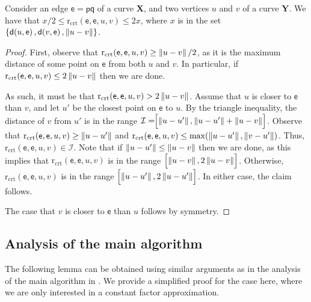 \documentclass[12pt]{article}
\newcommand{\seclab}[1]{\label{sec:#1}}
\newcommand{\lemlab}[1]{\label{lemma:#1}}
\newcommand{\pbrc}[2][\!\!]{#1\left[ {#2} \MakeBig \right]}
\newcommand{\distX}[2]{\distCmd{#1 - #2}}
\newcommand{\pnt}{\mathsf{p}}
\newcommand{\pntA}{\mathsf{q}}
\newcommand{\cXBase}{X} \newcommand{\cYBase}{Y} \newcommand{\crvCBase}{{\pi}}
\newcommand{\cXOrig}{\pmb{\cXBase}}
\newcommand{\cYOrig}{\pmb{\cYBase}}
\providecommand{\pth}[2][\!]{#1\left({#2}\right)}
\providecommand{\brc}[1]{\left\{ {#1} \right\}}
\providecommand{\MakeBig}{\rule[-.2cm]{0cm}{0.4cm}}
\providecommand{\MakeBig}{\rule[-.2cm]{0cm}{0.4cm}}
\newcommand{\edge}{\mathsf{e}}
\newcommand{\rCreate}[4]{\mathrm{r}_{\mathrm{crt}}\pth{#1, #2, #3,#4}}
\newcommand{\Interval}{\mathcal{I}}
\newcommand{\distSet}[2]{\mathsf{d}\pth{#1, #2}}
\numberwithin{figure}{section}
\numberwithin{equation}{section}
\begin{document}
\begin{lemma}\lemlab{monotonicity}Consider an edge $\edge = \pnt \pntA$ of a curve $\cXOrig$, and
    two vertices $u$ and $v$ of a curve $\cYOrig$. We have that $x/2
    \leq \rCreate{\edge}{\edge}{u}{v} \leq 2x$, where $x$ is in the
    set $\brc{ \distSet{u}{\edge}, \distSet{v}{\edge}, \distX{u}{v}}$.
\end{lemma}
\begin{proof}
    First, observe that $\rCreate{\edge}{\edge}{u}{v} \geq
    \distX{u}{v}/2$, as it is the maximum distance of some point on
    $\edge$ from both $u$ and $v$. In particular, if
    $\rCreate{\edge}{\edge}{u}{v} \leq 2 \distX{u}{v}$ then we are
    done.
    
    As such, it must be that $\rCreate{\edge}{\edge}{u}{v} > 2
    \distX{u}{v}$. Assume that $u$ is closer to $\edge$ than $v$, and
    let $u'$ be the closest point on $\edge$ to $u$. By the triangle
    inequality, the distance of $v$ from $u'$ is in the range
    $\Interval = \pbrc{ \distX{u}{u'}, \distX{u}{u'} + \distX{u}{v}
    }$.  Observe that $\rCreate{\edge}{\edge}{u}{v} \geq
    \distX{u}{u'}$ and $\rCreate{\edge}{\edge}{u}{v} \leq \max
    \pth{\distX{u}{u'}, \distX{v}{u'}}$.  Thus,
    $\rCreate{\edge}{\edge}{u}{v} \in \Interval$. Note that if
    $\distX{u}{u'} \leq \distX{u}{v}$ then we are done, as this
    implies that $\rCreate{\edge}{\edge}{u}{v}$ is in the range
    $\pbrc[]{ \distX{u}{v}, 2 \distX{u}{v}}$. Otherwise,
    $\rCreate{\edge}{\edge}{u}{v}$ is in the range $\pbrc[]{
       \distX{u}{u'}, 2 \distX{u}{u'}}$. In either case, the claim
    follows.
    
    The case that $v$ is closer to $\edge$ than $u$ follows by
    symmetry.
\end{proof}

\subsection{Analysis of the main algorithm}
\seclab{algo:main:analysis}

The following lemma can be obtained using similar arguments as in the
analysis of the main algorithm in \cite{dhw-afdrc-12}. We provide a
simplified proof for the case here, where we are only interested in a
constant factor approximation.
\end{document}
